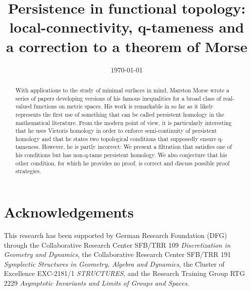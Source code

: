 \documentclass{amsart}
\theoremstyle{plain}
\theoremstyle{definition}
\begin{document}
\title[Persistence in functional topology]{Persistence in functional topology: local-connectivity, q-tameness and a correction to a theorem of Morse}
\author{}
\date{\today}

\begin{abstract}
With applications to the study of minimal surfaces in mind, Marston Morse wrote a series of papers developing versions of his famous inequalities for a broad class of real-valued functions on metric spaces. His work is remarkable in so far as it likely represents the first use of something that can be called persistent homology in the mathematical literature. From the modern point of view, it is particularly interesting that he uses Vietoris homology in order to enforce semi-continuity of persistent homology and that he states two topological conditions that supposedly ensure q-tameness. However, he is partly incorrect: We present a filtration that satisfies one of his conditions but has non-q-tame persistent homology. We also conjecture that his other condition, for which he provides no proof, is correct and discuss possible proof strategies.
\end{abstract}

\maketitle
\tableofcontents




%

%

\section*{Acknowledgements}
This research has been supported by German Research Foundation (DFG) through the Collaborative Research Center SFB/TRR 109 \emph{Discretization in Geometry and Dynamics}, the Collaborative Research Center SFB/TRR 191 \emph{Symplectic Structures in Geometry, Algebra and Dynamics}, the Cluster of Excellence EXC-2181/1 \emph{STRUCTURES}, and the Research Training Group RTG 2229 \emph{Asymptotic Invariants and Limits of Groups and Spaces}.




\todos
\end{document}
